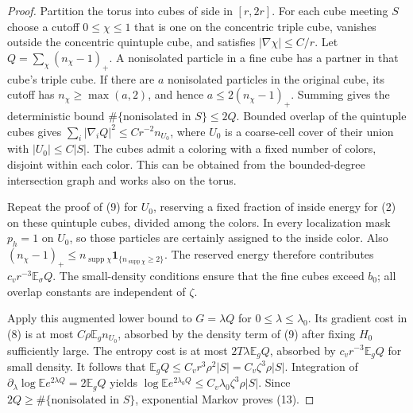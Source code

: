\begin{proof}
Partition the torus into cubes of side in $[r,2r]$.
For each cube meeting $S$ choose a cutoff $0\leq\chi\leq1$ that is one on
the concentric triple cube, vanishes outside the concentric
quintuple cube, and satisfies $|\nabla\chi|\leq C/r$.
Let $Q=\sum_\chi(n_\chi-1)_+$. A nonisolated particle in a
fine cube has a partner in that cube's triple cube. If there are
$a$ nonisolated particles in the original cube, its cutoff has
$n_\chi\geq\max(a,2)$, and hence
$a\leq2(n_\chi-1)_+$. Summing gives the deterministic bound
$\#\{\text{nonisolated in }S\}\leq2Q$.
Bounded overlap of the quintuple cubes gives
$\sum_i|\nabla_i Q|^2\leq Cr^{-2}n_{U_0}$,
where $U_0$ is a coarse-cell cover of their union with
$|U_0|\leq C|S|$. The cubes admit a coloring with a fixed number
of colors, disjoint within each color. This can be obtained from
the bounded-degree intersection graph and works also on the torus.

Repeat the proof of (9) for $U_0$, reserving a fixed fraction of
inside energy for (2) on these quintuple cubes, divided among the
colors. In every localization mask $p_h=1$ on $U_0$, so those
particles are certainly assigned to the inside color. Also
$(n_\chi-1)_+\leq n_{\operatorname{supp}\chi}
\mathbf1_{\{n_{\operatorname{supp}\chi}\geq2\}}$.
The reserved energy therefore contributes
$c_vr^{-3}\mathbb E_\sigma Q$. The small-density conditions ensure
that the fine cubes exceed $b_0$; all overlap constants are
independent of $\zeta$.

Apply this augmented lower bound to $G=\lambda Q$ for
$0\leq\lambda\leq\lambda_0$. Its gradient cost in (8) is
at most $C\rho\mathbb E_g n_{U_0}$, absorbed by the density term
of (9) after fixing $H_0$ sufficiently large. The entropy cost is
at most $2T\lambda\mathbb E_gQ$, absorbed by
$c_vr^{-3}\mathbb E_gQ$ for small density. It follows that
$\mathbb E_gQ\leq C_vr^3\rho^2|S|
=C_v\zeta^3\rho|S|$.
Integration of $\partial_\lambda\log\mathbb E e^{2\lambda Q}
=2\mathbb E_gQ$ yields
$\log\mathbb E e^{2\lambda_0Q}
\leq C_v\lambda_0\zeta^3\rho|S|$.
Since $2Q\geq\#\{\text{nonisolated in }S\}$, exponential Markov
proves (13).
\end{proof}
